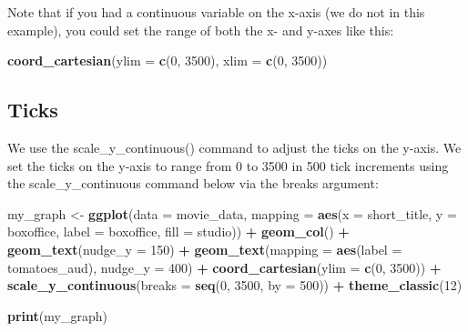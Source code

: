 \documentclass[
]{krantz}
\makeatletter
\newenvironment{Shaded}{\begin{snugshade}}{\end{snugshade}}
\newcommand{\DataTypeTok}[1]{\textcolor[rgb]{0.27,0.27,0.27}{#1}}
\newcommand{\DecValTok}[1]{\textcolor[rgb]{0.06,0.06,0.06}{#1}}
\newcommand{\KeywordTok}[1]{\textcolor[rgb]{0.27,0.27,0.27}{\textbf{#1}}}
\newcommand{\NormalTok}[1]{#1}
\newcommand{\OperatorTok}[1]{\textcolor[rgb]{0.43,0.43,0.43}{\textbf{#1}}}
\newcommand{\StringTok}[1]{\textcolor[rgb]{0.5,0.5,0.5}{#1}}
\newenvironment{kframe}{%
\medskip{}
\setlength{\fboxsep}{.8em}
 \def\at@end@of@kframe{}%
 \ifinner\ifhmode%
  \def\at@end@of@kframe{\end{minipage}}%
  \begin{minipage}{\columnwidth}%
 \fi\fi%
 \def\FrameCommand##1{\hskip\@totalleftmargin \hskip-\fboxsep
 \colorbox{shadecolor}{##1}\hskip-\fboxsep
     \hskip-\linewidth \hskip-\@totalleftmargin \hskip\columnwidth}%
 \MakeFramed {\advance\hsize-\width
   \@totalleftmargin\z@ \linewidth\hsize
   \@setminipage}}%
 {\par\unskip\endMakeFramed%
 \at@end@of@kframe}
\renewenvironment{Shaded}{\begin{kframe}}{\end{kframe}}
\makeatother
\begin{document}
Note that if you had a continuous variable on the x-axis (we do not in this example), you could set the range of both the x- and y-axes like this:

\begin{Shaded}
\begin{Highlighting}[]
\KeywordTok{coord_cartesian}\NormalTok{(}\DataTypeTok{ylim =} \KeywordTok{c}\NormalTok{(}\DecValTok{0}\NormalTok{, }\DecValTok{3500}\NormalTok{),}
                \DataTypeTok{xlim =} \KeywordTok{c}\NormalTok{(}\DecValTok{0}\NormalTok{, }\DecValTok{3500}\NormalTok{))}
\end{Highlighting}
\end{Shaded}

\hypertarget{ticks}{%
\subsection{Ticks}\label{ticks}}

We use the scale\_y\_continuous() command to adjust the ticks on the y-axis. We set the ticks on the y-axis to range from 0 to 3500 in 500 tick increments using the scale\_y\_continuous command below via the breaks argument:

\begin{Shaded}
\begin{Highlighting}[]
\NormalTok{my_graph <-}\StringTok{ }\KeywordTok{ggplot}\NormalTok{(}\DataTypeTok{data =}\NormalTok{ movie_data,}
           \DataTypeTok{mapping =} \KeywordTok{aes}\NormalTok{(}\DataTypeTok{x =}\NormalTok{ short_title,}
                         \DataTypeTok{y =}\NormalTok{ boxoffice,}
                         \DataTypeTok{label =}\NormalTok{ boxoffice, }
                         \DataTypeTok{fill =}\NormalTok{ studio)) }\OperatorTok{+}
\StringTok{  }\KeywordTok{geom_col}\NormalTok{() }\OperatorTok{+}
\StringTok{  }\KeywordTok{geom_text}\NormalTok{(}\DataTypeTok{nudge_y =} \DecValTok{150}\NormalTok{)  }\OperatorTok{+}
\StringTok{  }\KeywordTok{geom_text}\NormalTok{(}\DataTypeTok{mapping =} \KeywordTok{aes}\NormalTok{(}\DataTypeTok{label =}\NormalTok{ tomatoes_aud), }
            \DataTypeTok{nudge_y =} \DecValTok{400}\NormalTok{) }\OperatorTok{+}
\StringTok{  }\KeywordTok{coord_cartesian}\NormalTok{(}\DataTypeTok{ylim =} \KeywordTok{c}\NormalTok{(}\DecValTok{0}\NormalTok{, }\DecValTok{3500}\NormalTok{)) }\OperatorTok{+}
\StringTok{  }\KeywordTok{scale_y_continuous}\NormalTok{(}\DataTypeTok{breaks =} \KeywordTok{seq}\NormalTok{(}\DecValTok{0}\NormalTok{, }\DecValTok{3500}\NormalTok{, }\DataTypeTok{by =} \DecValTok{500}\NormalTok{)) }\OperatorTok{+}
\StringTok{  }\KeywordTok{theme_classic}\NormalTok{(}\DecValTok{12}\NormalTok{)}

\KeywordTok{print}\NormalTok{(my_graph)}
\end{Highlighting}
\end{Shaded}
\end{document}
